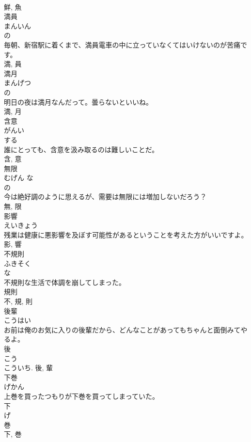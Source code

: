 \documentclass[8pt]{extreport}
\begin{document}
\begin{CJK}{UTF8}{min}
\\	鮮, 魚	
\\	満員	
\\	まんいん	
\\	の 
\\	毎朝、新宿駅に着くまで、満員電車の中に立っていなくてはいけないのが苦痛です。	
\\	満, 員	
\\	満月	
\\	まんげつ	
\\	の 
\\	明日の夜は満月なんだって。曇らないといいね。	
\\	満, 月	
\\	含意	
\\	がんい	
\\	する 
\\	誰にとっても、含意を汲み取るのは難しいことだ。	
\\	含, 意	
\\	無限	
\\	むげん	な 
\\	の 
\\	今は絶好調のように思えるが、需要は無限には増加しないだろう？	
\\	無, 限	
\\	影響	
\\	えいきょう	
\\	残業は健康に悪影響を及ぼす可能性があるということを考えた方がいいですよ。	
\\	影, 響	
\\	不規則	
\\	ふきそく	
\\	な 
\\	不規則な生活で体調を崩してしまった。	
\\	規則 
\\	不, 規, 則	
\\	後輩	
\\	こうはい	
\\	お前は俺のお気に入りの後輩だから、どんなことがあってもちゃんと面倒みてやるよ。	
\\	後 
\\	こう 
\\	こういち.	後, 輩	
\\	下巻	
\\	げかん	
\\	上巻を買ったつもりが下巻を買ってしまっていた。	
\\	下 
\\	げ 
\\	巻 
\\	下, 巻	

\end{CJK}
\end{document}
